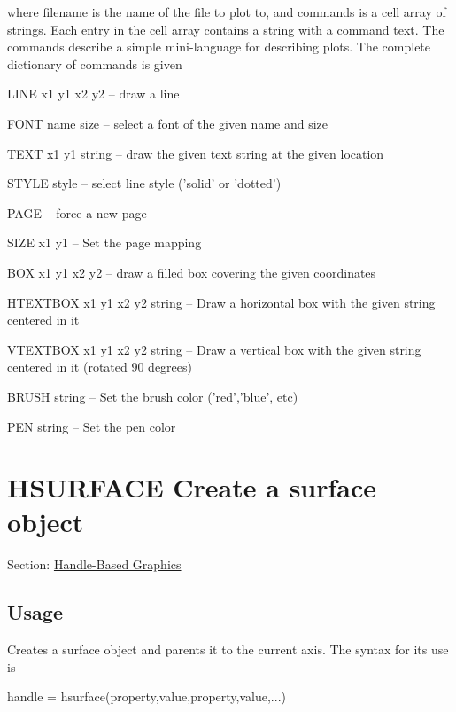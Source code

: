  where {\ttfamily filename} is the name of the file to plot to, and {\ttfamily commands} is a cell array of strings. Each entry in the cell array contains a string with a command text. The commands describe a simple mini-\/language for describing plots. The complete dictionary of commands is given 
\begin{DoxyItemize}
\item {\ttfamily L\-I\-N\-E x1 y1 x2 y2} -- draw a line  
\item {\ttfamily F\-O\-N\-T name size} -- select a font of the given name and size  
\item {\ttfamily T\-E\-X\-T x1 y1 string} -- draw the given text string at the given location  
\item {\ttfamily S\-T\-Y\-L\-E style} -- select line style ('solid' or 'dotted')  
\item {\ttfamily P\-A\-G\-E} -- force a new page  
\item {\ttfamily S\-I\-Z\-E x1 y1} -- Set the page mapping  
\item {\ttfamily B\-O\-X x1 y1 x2 y2} -- draw a filled box covering the given coordinates  
\item {\ttfamily H\-T\-E\-X\-T\-B\-O\-X x1 y1 x2 y2 string} -- Draw a horizontal box with the given string centered in it  
\item {\ttfamily V\-T\-E\-X\-T\-B\-O\-X x1 y1 x2 y2 string} -- Draw a vertical box with the given string centered in it (rotated 90 degrees)  
\item {\ttfamily B\-R\-U\-S\-H string} -- Set the brush color ('red','blue', etc)  
\item {\ttfamily P\-E\-N string} -- Set the pen color  
\end{DoxyItemize}\hypertarget{handle_hsurface}{}\section{H\-S\-U\-R\-F\-A\-C\-E Create a surface object}\label{handle_hsurface}
Section\-: \hyperlink{sec_handle}{Handle-\/\-Based Graphics} \hypertarget{vtkwidgets_vtkxyplotwidget_Usage}{}\subsection{Usage}\label{vtkwidgets_vtkxyplotwidget_Usage}
Creates a surface object and parents it to the current axis. The syntax for its use is \begin{DoxyVerb}  handle = hsurface(property,value,property,value,...)
\end{DoxyVerb}
